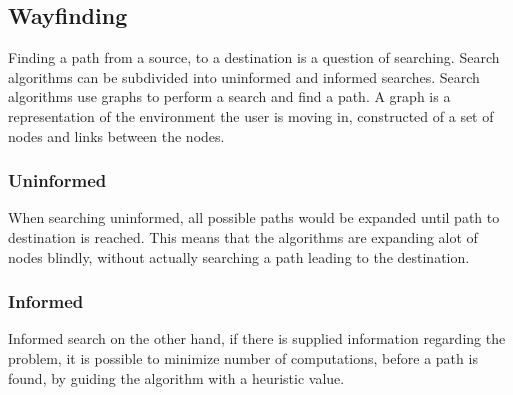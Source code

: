 
\subsection{Wayfinding}\label{sub:way}

Finding a path from a source, to a destination is a question of searching. Search algorithms can be subdivided into uninformed and informed searches. Search algorithms use graphs to perform a search and find a path. A graph is a representation of the environment the user is moving in, constructed of a set of nodes and links between the nodes. 

\subsubsection{Uninformed}

When searching uninformed, all possible paths would be expanded until path to destination is reached. This means that the algorithms are expanding alot of nodes blindly, without actually searching a path leading to the destination.

\subsubsection{Informed}

Informed search on the other hand, if there is supplied information regarding the problem, it is possible to minimize number of computations, before a path is found, by guiding the algorithm with a heuristic value.